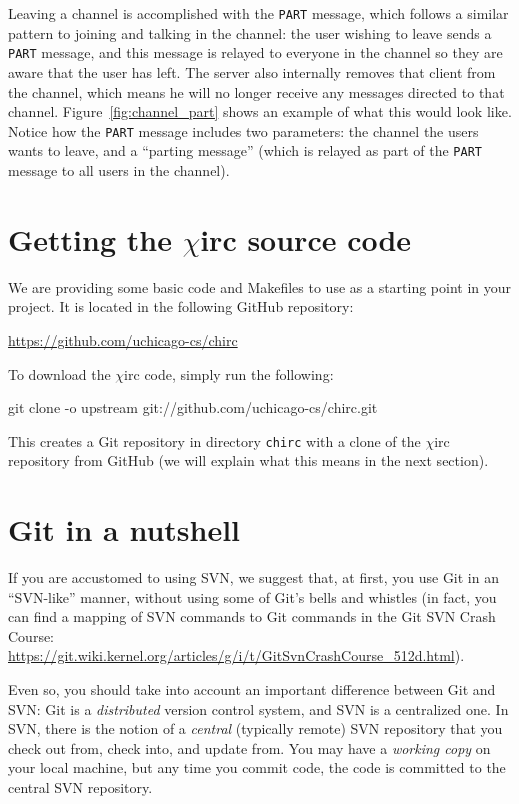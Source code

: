 \documentclass[10pt]{article}
\newcommand{\chirc}{$\chi$\textsf{irc} }
\newenvironment{example}%
{\VerbatimEnvironment\begin{Sbox}\begin{VerbExample}}%
{\end{VerbExample}\end{Sbox}\setlength{\fboxsep}{8pt}\begin{center}\fcolorbox{black}{backgroundgray}{\TheSbox}\end{center}}
\begin{document}
Leaving a channel is accomplished with the \texttt{PART} message, which follows a similar pattern to joining and talking in the channel: the user wishing to leave sends a \texttt{PART} message, and this message is relayed to everyone in the channel so they are aware that the user has left. The server also internally removes that client from the channel, which means he will no longer receive any messages directed to that channel. Figure~\ref{fig:channel_part} shows an example of what this would look like. Notice how the \texttt{PART} message includes two parameters: the channel the users wants to leave, and a ``parting message'' (which is relayed as part of the \texttt{PART} message to all users in the channel).

\section{Getting the \chirc source code}
\label{sec:code}

We are providing some basic code and Makefiles to use as a starting point in your project. It is located in the following GitHub repository:

\begin{center}
\url{https://github.com/uchicago-cs/chirc}
\end{center}

To download the \chirc code, simply run the following:

\begin{example}
git clone -o upstream git://github.com/uchicago-cs/chirc.git
\end{example}

This creates a Git repository in directory \texttt{chirc} with a clone of the \chirc repository from GitHub (we will explain what this means in the next section). 

\section{Git in a nutshell}
\label{sec:git}

If you are accustomed to using SVN, we suggest that, at first, you use Git in an ``SVN-like'' manner, without using some of Git's bells and whistles (in fact, you can find a mapping of SVN commands to Git commands in the Git SVN Crash Course: \url{https://git.wiki.kernel.org/articles/g/i/t/GitSvnCrashCourse_512d.html}).

Even so, you should take into account an important difference between Git and SVN: Git is a \emph{distributed} version control system, and SVN is a centralized one. In SVN, there is the notion of a \emph{central} (typically remote) SVN repository that you check out from, check into, and update from. You may have a \emph{working copy} on your local machine, but any time you commit code, the code is committed to the central SVN repository.
\end{document}
